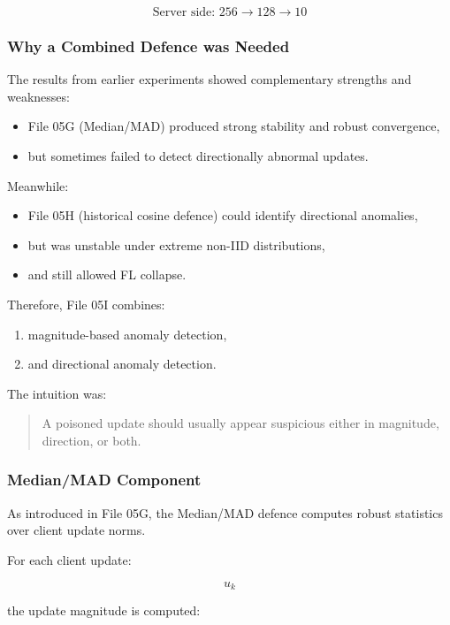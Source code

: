 \[
\text{Server side: } 256 \rightarrow 128 \rightarrow 10
\]

\subsubsection*{Why a Combined Defence was Needed}

The results from earlier experiments showed complementary strengths and weaknesses:

\begin{itemize}
    \item File 05G (Median/MAD) produced strong stability and robust convergence,
    \item but sometimes failed to detect directionally abnormal updates.
\end{itemize}

Meanwhile:

\begin{itemize}
    \item File 05H (historical cosine defence) could identify directional anomalies,
    \item but was unstable under extreme non-IID distributions,
    \item and still allowed FL collapse.
\end{itemize}

Therefore, File 05I combines:
\begin{enumerate}
    \item magnitude-based anomaly detection,
    \item and directional anomaly detection.
\end{enumerate}

The intuition was:

\begin{quote}
A poisoned update should usually appear suspicious either in magnitude, direction, or both.
\end{quote}

\subsubsection*{Median/MAD Component}

As introduced in File 05G, the Median/MAD defence computes robust statistics over client update norms.

For each client update:

\[
u_k
\]

the update magnitude is computed:

